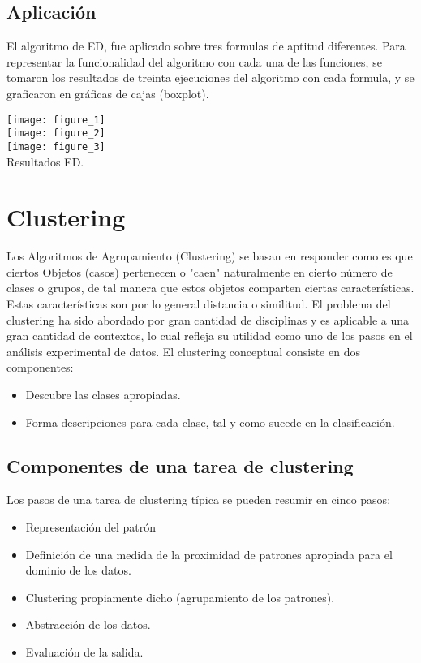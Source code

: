 \documentclass[
]{article}
\begin{document}
\subsection{Aplicación}
El algoritmo de ED, fue aplicado sobre tres formulas de aptitud diferentes. Para representar la funcionalidad del algoritmo con cada una de las funciones, se tomaron los resultados de treinta ejecuciones del algoritmo con cada formula, y se graficaron en gráficas de cajas (boxplot).

\begin{table}[H]
\centering
\texttt{[image: figure\_1]} \\
\texttt{[image: figure\_2]} \\
\texttt{[image: figure\_3]} \\
\caption{Resultados ED.}
\label{Resultados ED}
\end{table}

\newpage
\section{Clustering}
Los Algoritmos de Agrupamiento (Clustering) se basan en responder como es que ciertos Objetos (casos) pertenecen o "caen" naturalmente en cierto número de clases o grupos, de tal manera que estos objetos comparten ciertas características. Estas características son por lo general distancia o similitud. 
El problema del clustering ha sido abordado por gran cantidad de disciplinas y es aplicable a una gran cantidad de contextos, lo cual refleja su utilidad como uno de los pasos en el análisis experimental de datos.
El clustering conceptual consiste en dos componentes:
\begin{itemize}
	\item Descubre las clases apropiadas.
	\item Forma descripciones para cada clase, tal y como sucede en la clasificación.
\end{itemize}
\subsection{Componentes de una tarea de clustering}
Los pasos de una tarea de clustering típica se pueden resumir en cinco pasos:
\begin{itemize}
	\item Representación del patrón
	\item Definición de una medida de la proximidad de patrones apropiada para el dominio de los datos.
	\item Clustering propiamente dicho (agrupamiento de los patrones).
	\item Abstracción de los datos.
	\item Evaluación de la salida.
\end{itemize}
\end{document}
